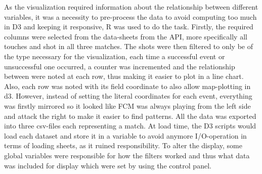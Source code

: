 \documentclass[Report.tex]{subfiles}
\begin{document}
As the visualization required information about the relationship between different variables, it was a necessity to pre-process the data to avoid computing too much in D3 and keeping it responsive, R was used to do the task. Firstly, the required columns were selected from the data-sheets from the API, more specifically all touches and shot in all three matches. The shots were then filtered to only be of the type necessary for the visualization, each time a successful event or unsuccessful one occurred, a counter was incremented and the relationship between were noted at each row, thus making it easier to plot in a line chart. Also, each row was noted with its field coordinate to also allow map-plotting in d3. However, instead of setting the literal coordinates for each event, everything was firstly mirrored so it looked like FCM was always playing from the left side and attack the right to make it easier to find patterns. All the data was exported into three csv-files each representing a match. At load time, the D3 scripts would load each dataset and store it in a variable to avoid anymore I/O-operation in terms of loading sheets, as it ruined responsibility. To alter the display, some global variables were responsible for how the filters worked and thus what data was included for display which were set by using the control panel. 

	
\end{document}
